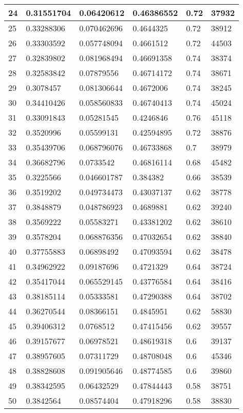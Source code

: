 \begin{longtable}{|l|l|l|l|l|l|}
24 & 0.31551704 & 0.06420612 & 0.46386552 & 0.72 & 37932 \\ \hline 
25 & 0.33288306 & 0.070462696 & 0.4644325 & 0.72 & 38912 \\ \hline 
26 & 0.33303592 & 0.057748094 & 0.4661512 & 0.72 & 44503 \\ \hline 
27 & 0.32839802 & 0.081968494 & 0.46691358 & 0.74 & 38374 \\ \hline 
28 & 0.32583842 & 0.07879556 & 0.46714172 & 0.74 & 38671 \\ \hline 
29 & 0.3078457 & 0.081306644 & 0.4672006 & 0.74 & 38245 \\ \hline 
30 & 0.34410426 & 0.058560833 & 0.46740413 & 0.74 & 45024 \\ \hline 
31 & 0.33091843 & 0.05281545 & 0.4246846 & 0.76 & 45118 \\ \hline 
32 & 0.3520996 & 0.05599131 & 0.42594895 & 0.72 & 38876 \\ \hline 
33 & 0.35439706 & 0.068796076 & 0.46733868 & 0.7 & 38979 \\ \hline 
34 & 0.36682796 & 0.0733542 & 0.46816114 & 0.68 & 45482 \\ \hline 
35 & 0.3225566 & 0.046601787 & 0.384382 & 0.66 & 38539 \\ \hline 
36 & 0.3519202 & 0.049734473 & 0.43037137 & 0.62 & 38778 \\ \hline 
37 & 0.3848879 & 0.048786923 & 0.4689881 & 0.62 & 39240 \\ \hline 
38 & 0.3569222 & 0.05583271 & 0.43381202 & 0.62 & 38610 \\ \hline 
39 & 0.3578204 & 0.068876356 & 0.47032654 & 0.62 & 38840 \\ \hline 
40 & 0.37755883 & 0.06898492 & 0.47093594 & 0.62 & 38478 \\ \hline 
41 & 0.34962922 & 0.09187696 & 0.4721329 & 0.64 & 38724 \\ \hline 
42 & 0.35417044 & 0.065529145 & 0.43776584 & 0.64 & 38416 \\ \hline 
43 & 0.38185114 & 0.05333581 & 0.47290388 & 0.64 & 38702 \\ \hline 
44 & 0.36270544 & 0.08366151 & 0.4845951 & 0.62 & 58830 \\ \hline 
45 & 0.39406312 & 0.0768512 & 0.47415456 & 0.62 & 39557 \\ \hline 
46 & 0.39157677 & 0.06978521 & 0.48619318 & 0.6 & 39137 \\ \hline 
47 & 0.38957605 & 0.07311729 & 0.48708048 & 0.6 & 45346 \\ \hline 
48 & 0.38828608 & 0.091905646 & 0.48774585 & 0.6 & 39860 \\ \hline 
49 & 0.38342595 & 0.06432529 & 0.47844443 & 0.58 & 38751 \\ \hline 
50 & 0.3842564 & 0.08574404 & 0.47918296 & 0.58 & 38830 \\ \hline 
\end{longtable}